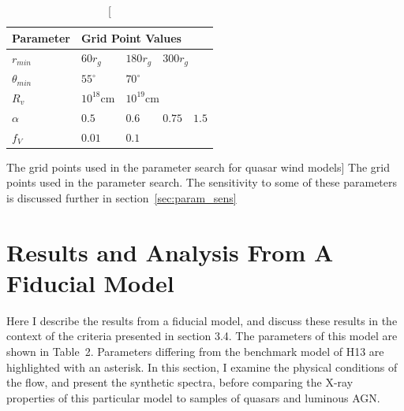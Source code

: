 \begin{table}
\centering
\begin{tabular}{p{2cm}p{1cm}p{1cm}p{1cm}p{1cm}}
Parameter & \multicolumn{4}{l}{Grid Point Values}  \\
\hline \hline 
$r_{min}$ 	&	 $60r_{g}$ & $180r_{g}$ & \multicolumn{2}{l}{$300r_{g}$} \\ 
$\theta_{min}$ 	& $55^{\circ}$ & \multicolumn{3}{l}{$70^{\circ}$} \\ 
$R_v$  	        &	 $10^{18}$cm & \multicolumn{3}{l}{$10^{19}$cm} \\ 
$\alpha$ 	&	 $0.5$ & $0.6$ & $0.75$ & $1.5$ \\
$f_V$ 	&	 $0.01$ & \multicolumn{3}{l}{$0.1$}  \\
\hline 
\end{tabular}
\caption
[The grid points used in the parameter search for quasar wind models]
{The grid points used in the parameter search.
The sensitivity to some of these parameters is discussed 
further in section~\ref{sec:param_sens}}
\label{grid_table}
\end{table}







\section{Results and Analysis From A Fiducial Model}
\label{sec:qso_results}
Here I describe the results from a fiducial model,
and discuss these results in the context of the criteria 
presented in section 3.4. The parameters of this model are shown in Table~2.
Parameters differing from the benchmark model of H13 are 
highlighted with an asterisk. In this section, I examine the physical 
conditions of the flow, and present the synthetic spectra, before comparing
the X-ray properties of this particular model to samples of
quasars and luminous AGN. 

